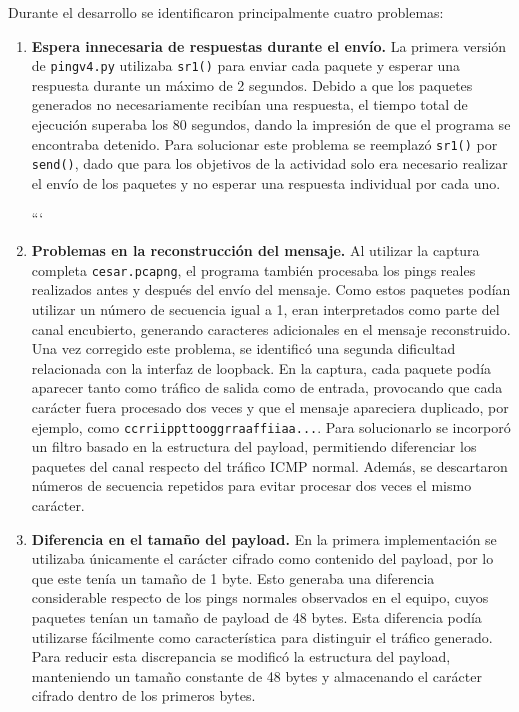 \documentclass[letter,12pt]{article}
\begin{document}
Durante el desarrollo se identificaron principalmente cuatro problemas:

\begin{enumerate}
\item \textbf{Espera innecesaria de respuestas durante el envío.} La primera versión de \texttt{pingv4.py} utilizaba \texttt{sr1()} para enviar cada paquete y esperar una respuesta durante un máximo de 2 segundos. Debido a que los paquetes generados no necesariamente recibían una respuesta, el tiempo total de ejecución superaba los 80 segundos, dando la impresión de que el programa se encontraba detenido. Para solucionar este problema se reemplazó \texttt{sr1()} por \texttt{send()}, dado que para los objetivos de la actividad solo era necesario realizar el envío de los paquetes y no esperar una respuesta individual por cada uno.

```
\item \textbf{Problemas en la reconstrucción del mensaje.} Al utilizar la captura completa \texttt{cesar.pcapng}, el programa también procesaba los pings reales realizados antes y después del envío del mensaje. Como estos paquetes podían utilizar un número de secuencia igual a 1, eran interpretados como parte del canal encubierto, generando caracteres adicionales en el mensaje reconstruido. Una vez corregido este problema, se identificó una segunda dificultad relacionada con la interfaz de loopback. En la captura, cada paquete podía aparecer tanto como tráfico de salida como de entrada, provocando que cada carácter fuera procesado dos veces y que el mensaje apareciera duplicado, por ejemplo, como \texttt{ccrriippttooggrraaffiiaa...}. Para solucionarlo se incorporó un filtro basado en la estructura del payload, permitiendo diferenciar los paquetes del canal respecto del tráfico ICMP normal. Además, se descartaron números de secuencia repetidos para evitar procesar dos veces el mismo carácter.

\item \textbf{Diferencia en el tamaño del payload.} En la primera implementación se utilizaba únicamente el carácter cifrado como contenido del payload, por lo que este tenía un tamaño de 1 byte. Esto generaba una diferencia considerable respecto de los pings normales observados en el equipo, cuyos paquetes tenían un tamaño de payload de 48 bytes. Esta diferencia podía utilizarse fácilmente como característica para distinguir el tráfico generado. Para reducir esta discrepancia se modificó la estructura del payload, manteniendo un tamaño constante de 48 bytes y almacenando el carácter cifrado dentro de los primeros bytes.


\end{enumerate}
\end{document}
